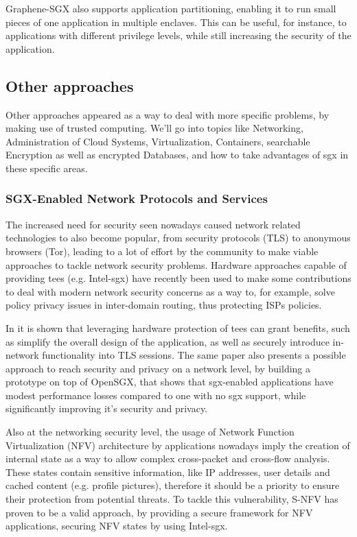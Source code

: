 Graphene-SGX also supports application partitioning, enabling it to run small pieces of one application in multiple enclaves. This can be useful, for instance, to applications with different privilege levels, while still increasing the security of the application.
\subsection{Other approaches}
\label{ssec:otherSGXFrameworks}



Other approaches appeared as a way to deal with more specific problems, by making use of trusted computing. We'll go into topics like Networking, Administration of Cloud Systems, Virtualization, Containers, searchable Encryption as well as encrypted Databases, and how to take advantages of \gls{sgx} in these specific areas. 



\subsubsection{SGX-Enabled Network Protocols and Services}
\label{sssec:sgxNetworking}


The increased need for security seen nowadays caused network related technologies to also become popular, from security protocols (TLS) to anonymous browsers (Tor), leading to a lot of effort by the community to make viable approaches to tackle network security problems. 
Hardware approaches capable of providing \gls{tee}s (e.g. Intel-\gls{sgx}) have recently been used to make some contributions to deal with modern network security concerns as a way to, for example, solve policy privacy issues in inter-domain routing, thus protecting ISPs policies.

In \cite{torSGXPaper} it is shown that leveraging hardware protection of \gls{tee}s can grant benefits, such as simplify the overall design of the application, as well as securely introduce in-network functionality into TLS sessions. The same paper also presents a possible approach to reach security and privacy on a network level, by building a prototype on top of OpenSGX, that shows that \gls{sgx}-enabled applications have modest performance losses compared to one with no \gls{sgx} support, while significantly improving it’s security and privacy.

Also at the networking security level, the usage of Network Function Virtualization (NFV) architecture by applications nowadays imply the creation of internal state as a way to allow complex cross-packet and cross-flow analysis. 
These states contain sensitive information, like IP addresses, user details and cached content (e.g. profile pictures), therefore it should be a priority to ensure their protection from potential threats.
To tackle this vulnerability, S-NFV \cite{sNFVPaper} has proven to be a valid approach, by providing a secure framework for NFV applications, securing NFV states by using Intel-\gls{sgx}.

